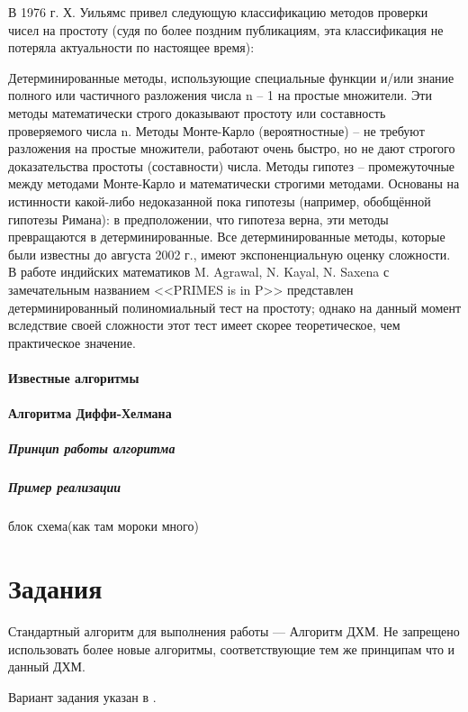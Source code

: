 В 1976 г. Х. Уильямс привел следующую классификацию методов проверки чисел на
простоту (судя по более поздним публикациям, эта классификация не потеряла
актуальности по настоящее время):

Детерминированные методы, использующие специальные функции и/или знание
полного или частичного разложения числа n – 1 на простые множители. Эти
методы математически строго доказывают простоту или составность проверяемого
числа n. Методы Монте-Карло (вероятностные) – не требуют разложения на
простые множители, работают очень быстро, но не дают строгого доказательства
простоты (составности) числа. Методы гипотез – промежуточные между методами
Монте-Карло и математически строгими методами. Основаны на истинности
какой-либо недоказанной пока гипотезы (например, обобщённой гипотезы Римана):
в предположении, что гипотеза верна, эти методы превращаются в
детерминированные. Все детерминированные методы, которые были известны до
августа 2002 г., имеют экспоненциальную оценку сложности. В работе индийских
математиков M. Agrawal, N. Kayal, N. Saxena с замечательным названием
<<PRIMES is in P>> представлен детерминированный полиномиальный тест на
простоту; однако на данный момент вследствие своей сложности этот тест имеет
скорее теоретическое, чем практическое значение.

\paragraph{Известные алгоритмы}
%

\paragraph{Алгоритма Диффи-Хелмана}
%

\subparagraph{Принцип работы алгоритма}


\subparagraph{Пример реализации} блок схема(как там мороки много)

\section{Задания}\label{sect2_b}
%
Стандартный алгоритм для выполнения работы --- Алгоритм ДХМ. Не запрещено
использовать более новые алгоритмы, соответствующие тем же принципам что и
данный ДХМ.

Вариант задания указан в .

